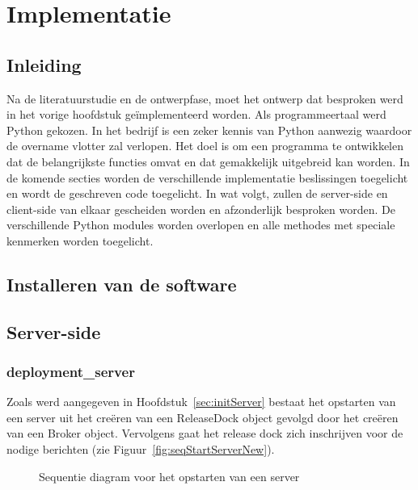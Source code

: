 \chapter{Implementatie}
\section{Inleiding}
Na de literatuurstudie en de ontwerpfase, moet het ontwerp dat besproken werd in het vorige hoofdstuk geïmplementeerd worden.
Als programmeertaal werd Python gekozen.
In het bedrijf is een zeker kennis van Python aanwezig waardoor de overname vlotter zal verlopen.
Het doel is om een programma te ontwikkelen dat de belangrijkste functies omvat en dat gemakkelijk uitgebreid kan worden.
In de komende secties worden de verschillende implementatie beslissingen toegelicht en wordt de geschreven code toegelicht.
In wat volgt, zullen de server-side en client-side van elkaar gescheiden worden en afzonderlijk besproken worden.
De verschillende Python modules worden overlopen en alle methodes met speciale kenmerken worden toegelicht.

\section{Installeren van de software}

\section{Server-side}
\subsection{deployment\_server}
Zoals werd aangegeven in Hoofdstuk~\ref{sec:initServer} bestaat het opstarten van een server uit het creëren van een ReleaseDock object gevolgd door het creëren van een Broker object.
Vervolgens gaat het release dock zich inschrijven voor de nodige berichten (zie Figuur~\vref{fig:seqStartServerNew}).

\begin{figure}[!ht]
\centering
{}
\caption{Sequentie diagram voor het opstarten van een server}
\label{fig:seqStartServerNew}
\end{figure}


